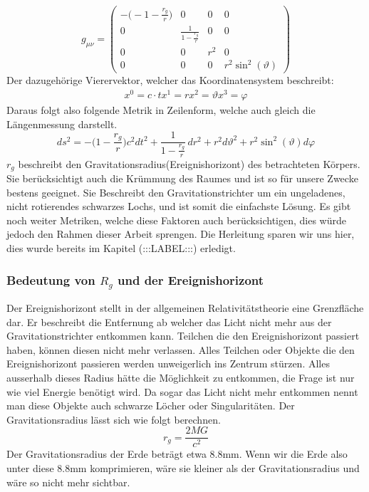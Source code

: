 \begin{refsection}
	\begin{equation}
	g_{\mu\nu}=
	\begin{pmatrix}
	-\biggl(-1-\frac{r_{g}}{r}\biggr) & 0 & 0 & 0 \\
	0 & \frac{1}{\displaystyle1-\frac{r_{g}}{r}} & 0 & 0 \\
	0 & 0 & r^{2} & 0 \\
	0 & 0 & 0 & r^{2}\sin^{2}(\vartheta)
	\end{pmatrix}
	\end{equation}
	Der dazugehörige Vierervektor, welcher das Koordinatensystem beschreibt:
	\begin{align*}
	x^{0}=c\cdot t
	x^{1}=r
	x^{2}=\vartheta
	x^{3}=\varphi
	\end{align*}
	Daraus folgt also folgende Metrik in Zeilenform, welche auch gleich die Längenmessung darstellt.
	\begin{equation}
	ds^2
	=
	-\biggl(1-\frac{r_g}r\biggr)c^2dt^2
	+
	\frac{1}{\displaystyle 1-\frac{r_g}r}\,dr^2 
	+
	r^2d\vartheta^2 
	+ 
	r^2\sin^2(\vartheta)d\varphi
	\end{equation}
	$r_g$ beschreibt den Gravitationsradius(Ereignishorizont) des betrachteten Körpers.
	Sie berücksichtigt auch die Krümmung des Raumes und ist so für unsere Zwecke bestens geeignet. Sie Beschreibt den Gravitationstrichter um ein ungeladenes, nicht rotierendes schwarzes Lochs, und ist somit die einfachste Lösung. Es gibt noch weiter Metriken, welche diese Faktoren auch berücksichtigen, dies würde jedoch den Rahmen dieser Arbeit sprengen.
	Die Herleitung sparen wir uns hier, dies wurde bereits im Kapitel (:::LABEL:::) erledigt. 

	\subsubsection{Bedeutung von $R_{g}$ und der Ereignishorizont}
	Der Ereignishorizont stellt in der allgemeinen Relativitätstheorie eine Grenzfläche dar. Er beschreibt die Entfernung ab welcher das Licht nicht mehr aus der Gravitationstrichter entkommen kann. Teilchen die den Ereignishorizont passiert haben, können diesen nicht mehr verlassen. Alles Teilchen oder Objekte die den Ereignishorizont passieren werden unweigerlich ins Zentrum stürzen. Alles ausserhalb dieses Radius hätte die Möglichkeit zu entkommen, die Frage ist nur wie viel Energie benötigt wird. Da sogar das Licht nicht mehr entkommen nennt man diese Objekte auch schwarze Löcher oder Singularitäten.
	Der Gravitationsradius lässt sich wie folgt berechnen.
	\begin{equation} \label{Gravitationsradius}
	r_{g}= \frac{2MG}{c^2}
	\end{equation}
	Der Gravitationsradius der Erde beträgt etwa 8.8mm. Wenn wir die Erde also unter diese 8.8mm komprimieren, wäre sie kleiner als der Gravitationsradius und wäre so nicht mehr sichtbar.
	

\end{refsection}
